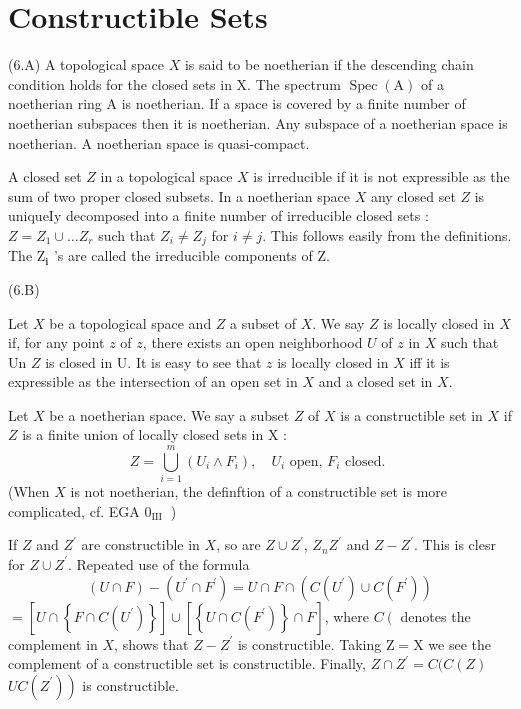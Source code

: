 \section{Constructible Sets}
(6.A) A topological space $X$ is said to be noetherian if the descending chain condition holds for the closed sets in X. The spectrum $\operatorname{Spec}(\mathrm{A})$ of a noetherian ring A is noetherian. If a space is covered by a finite number of noetherian subspaces then it is noetherian. Any subspace of a noetherian space is noetherian. A noetherian space is quasi-compact.

A closed set $Z$ in a topological space $X$ is irreducible if it is not expressible as the sum of two proper closed subsets. In a noetherian space $X$ any closed set $Z$ is uniqueIy decomposed into a finite number of irreducible closed sets : $Z=Z_{1} \cup \ldots Z_{r}$ such that $Z_{i} \neq Z_{j}$ for $i \neq j$. This follows easily from the definitions. The $\mathrm{Z}_{\mathbf{i}}$ 's are called the irreducible components of $\mathrm{Z}$.

(6.B)

Let $X$ be a topological space and $Z$ a subset of $X$. We say $Z$ is locally closed in $X$ if, for any point $z$ of $z$, there exists an open neighborhood $U$ of $z$ in $X$ such that Un $Z$ is closed in U. It is easy to see that $z$ is locally closed in $X$ iff it is expressible as the intersection of an open set in $X$ and a closed set in $X$.

Let $X$ be a noetherian space. We say a subset $Z$ of $X$ is a constructible set in $X$ if $Z$ is a finite union of locally closed sets in $\mathrm{X}$ :
$$
Z=\bigcup_{i=1}^{m}\left(U_{i} \wedge F_{i}\right), \quad U_{i} \text { open, } F_{i} \text { closed. }
$$
(When $X$ is not noetherian, the definftion of a constructible set is more complicated, cf. EGA $0_{\text {III }}$ )

If $Z$ and $Z^{\prime}$ are constructible in $X$, so are $Z \cup Z^{\prime}$, $Z_{n} Z^{\prime}$ and $Z-Z^{\prime}$. This is clesr for $Z \cup Z^{\prime}$. Repeated use of the formula
$$
(U \cap F)-\left(U^{\prime} \cap F^{\prime}\right)=U \cap F \cap\left(C\left(U^{\prime}\right) \cup C\left(F^{\prime}\right)\right)
$$
$=\left[U \cap\left\{F \cap C\left(U^{\prime}\right)\right\}\right] \cup\left[\left\{U \cap C\left(F^{\prime}\right)\right\} \cap F\right]$, where $C\left(\right.$ denotes the complement in $X$, shows that $Z-Z^{\prime}$ is constructible. Taking $\mathrm{Z}=\mathrm{X}$ we see the complement of a constructible set is constructible. Finally, $Z \cap Z^{\prime}=C(C(Z)$ $\left.U C\left(Z^{\prime}\right)\right)$ is constructible.

